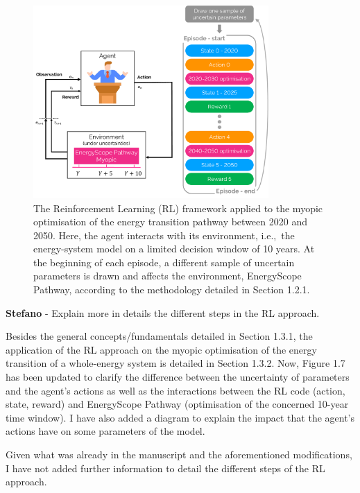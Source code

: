 \documentclass[12pt,a4paper]{article}
\def\ie{i.e.,\ }
\begin{document}
\begin{figure}[!htbp]
\centering
\includegraphics[width=0.8\textwidth]{Schematics_RL.pdf}
\caption{The Reinforcement Learning (RL) framework applied to the myopic optimisation of the energy transition pathway between 2020 and 2050. Here, the agent interacts with its environment, \ie the energy-system model on a limited decision window of 10 years. At the beginning of each episode, a different sample of uncertain parameters is drawn and affects the environment, EnergyScope Pathway, according to the methodology detailed in Section 1.2.1.}
\label{fig:Schematics_RL}
\end{figure}

\begin{mdframed}[style=comment] %
{\color{orange} \textbf{Stefano}} - Explain more in details the different steps in the RL approach.
\end{mdframed}

\noindent Besides the general concepts/fundamentals detailed in Section 1.3.1, the application of the RL approach on the myopic optimisation of the energy transition of a whole-energy system is detailed in Section 1.3.2. Now, Figure 1.7 has been updated to clarify the difference between the uncertainty of parameters and the agent's actions as well as the interactions between the RL code (action, state, reward) and EnergyScope Pathway (optimisation of the concerned 10-year time window). I have also added a diagram to explain the impact that the agent's actions have on some parameters of the model. 

Given what was already in the manuscript and the aforementioned modifications, I have not added further information to detail the different steps of the RL approach.
\end{document}
